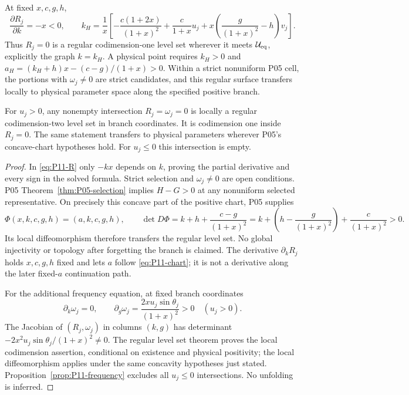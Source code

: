 \begin{proposition}
\label{prop:P11-surface}
At fixed $x,c,g,h$,
\begin{equation}
 \frac{\partial R_j}{\partial k}=-x<0,
 \qquad
 k_H=\frac1x\left[-\frac{c(1+2x)}{(1+x)^2}
       +\frac{c}{1+x}u_j
       +x\left(\frac{g}{(1+x)^2}-h\right)v_j\right].
 \label{eq:P11-kH}
\end{equation}
Thus $R_j=0$ is a regular codimension-one level set wherever it
meets $\mathcal U_{\rm eq}$, explicitly the graph $k=k_H$.
A physical point requires $k_H>0$ and
$a_H=(k_H+h)x-(c-g)/(1+x)>0$. Within a strict nonuniform
P05 cell, the portions with $\omega_j\ne0$ are strict candidates,
and this regular surface transfers locally to physical parameter space
along the specified positive branch.

For $u_j>0$, any nonempty intersection $R_j=\omega_j=0$ is
locally a regular codimension-two level set in branch coordinates.
It is codimension one inside $R_j=0$. The same statement transfers
to physical parameters wherever P05's concave-chart hypotheses hold.
For $u_j\le0$ this intersection is empty.
\end{proposition}
\begin{proof}
In \eqref{eq:P11-R} only $-kx$ depends on $k$, proving the
partial derivative and every sign in the solved formula. Strict
selection and $\omega_j\ne0$ are open conditions.
P05 Theorem~\ref{thm:P05-selection} implies $H-G>0$ at any
nonuniform selected representative. On precisely this concave part
of the positive chart, P05 supplies
\[
 \Phi(x,k,c,g,h)=(a,k,c,g,h),\qquad
 \det D\Phi=k+h+\frac{c-g}{(1+x)^2}
     =k+\left(h-\frac{g}{(1+x)^2}\right)
         +\frac{c}{(1+x)^2}>0.
\]
Its local diffeomorphism therefore transfers the regular level set.
No global injectivity or topology after forgetting the branch is claimed.
The derivative $\partial_k R_j$ holds $x,c,g,h$ fixed and lets $a$
follow \eqref{eq:P11-chart}; it is not a derivative along the later
fixed-$a$ continuation path.

For the additional frequency equation, at fixed branch coordinates
\[
 \partial_k\omega_j=0,\qquad
 \partial_g\omega_j=\frac{2xu_j\sin\theta_j}{(1+x)^2}>0
 \quad(u_j>0).
\]
The Jacobian of $(R_j,\omega_j)$ in columns $(k,g)$ has determinant
$-2x^2u_j\sin\theta_j/(1+x)^2\ne0$. The regular level set theorem
proves the local codimension assertion, conditional on existence and
physical positivity; the local diffeomorphism applies under the same
concavity hypotheses just stated. Proposition~\ref{prop:P11-frequency}
excludes all $u_j\le0$ intersections. No unfolding is inferred.
\end{proof}

